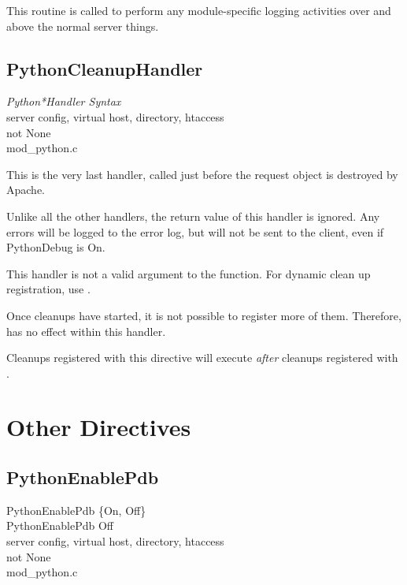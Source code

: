 This routine is called to perform any module-specific logging
activities over and above the normal server things.

\subsection{PythonCleanupHandler\label{dir-handlers-pch}}

\emph{Python*Handler Syntax}\\
server config, virtual host, directory, htaccess\\
not None\\
mod_python.c

This is the very last handler, called just before the request object
is destroyed by Apache.

Unlike all the other handlers, the return value of this handler is
ignored. Any errors will be logged to the error log, but will not be
sent to the client, even if PythonDebug is On.

This handler is not a valid argument to the 
function. For dynamic clean up registration, use
.

Once cleanups have started, it is not possible to register more of
them. Therefore,  has no effect within this
handler.

Cleanups registered with this directive will execute \emph{after} cleanups
registered with .

\section{Other Directives\label{dir-other}}

\subsection{PythonEnablePdb\label{dir-other-epd}}

PythonEnablePdb \{On, Off\} \\
PythonEnablePdb Off\\
server config, virtual host, directory, htaccess\\
not None\\
mod_python.c

